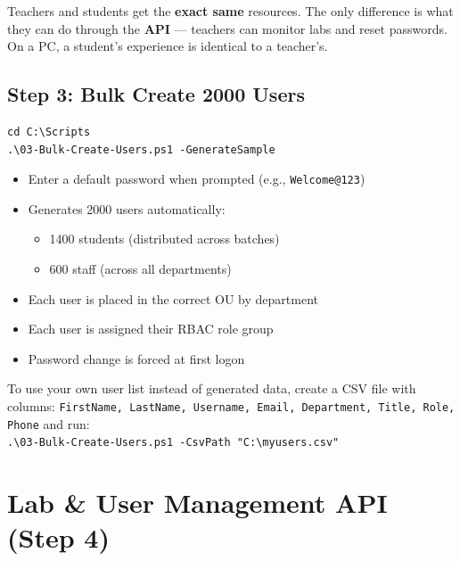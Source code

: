 ﻿\documentclass[12pt,a4paper]{article}
\begin{document}
\begin{tipbox}
Teachers and students get the \textbf{exact same} resources. The only difference is what they can do through the \textbf{API} --- teachers can monitor labs and reset passwords. On a PC, a student's experience is identical to a teacher's.
\end{tipbox}

\subsection{Step 3: Bulk Create 2000 Users}

\begin{lstlisting}
cd C:\Scripts
.\03-Bulk-Create-Users.ps1 -GenerateSample
\end{lstlisting}

\begin{itemize}
    \item Enter a default password when prompted (e.g., \texttt{Welcome@123})
    \item Generates 2000 users automatically:
    \begin{itemize}
        \item 1400 students (distributed across batches)
        \item 600 staff (across all departments)
    \end{itemize}
    \item Each user is placed in the correct OU by department
    \item Each user is assigned their RBAC role group
    \item Password change is forced at first logon
\end{itemize}

\begin{tipbox}
To use your own user list instead of generated data, create a CSV file with columns: \texttt{FirstName, LastName, Username, Email, Department, Title, Role, Phone} and run:\\[4pt]
\texttt{.\textbackslash 03-Bulk-Create-Users.ps1 -CsvPath "C:\textbackslash myusers.csv"}
\end{tipbox}

\section{Lab \& User Management API (Step 4)}
\end{document}
